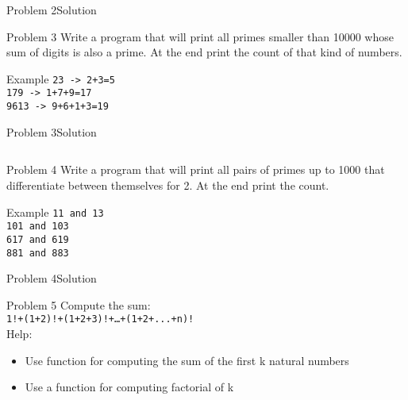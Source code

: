 \begin{frame}[fragile]{Problem 2}{Solution} 

\end{frame}

\begin{frame}{Problem 3}
Write a program that will print all primes smaller than 10000 whose sum of
digits is also a prime. At the end print the count of that kind of numbers.
\begin{exampleblock}{Example}
\texttt{23 -> 2+3=5}\\
\texttt{179 -> 1+7+9=17}\\
\texttt{9613 -> 9+6+1+3=19}
\end{exampleblock}
\end{frame}

\begin{frame}[fragile]{Problem 3}{Solution} 
\begin{columns}
    
    
\end{columns}
\end{frame}

\begin{frame}{Problem 4}
Write a program that will print all pairs of primes up to 1000 that
differentiate between themselves for 2. At the end print the count.
\begin{exampleblock}{Example}
\texttt{11 and 13}\\
\texttt{101 and 103}\\
\texttt{617 and 619}\\
\texttt{881 and 883}
\end{exampleblock}
\end{frame}

\begin{frame}[fragile]{Problem 4}{Solution}
   
\end{frame}

\begin{frame}{Problem 5}
Compute the sum:\\
\texttt{1!+(1+2)!+(1+2+3)!+\ldots+(1+2+...+n)!}
\\Help:\\
\begin{itemize}
    \item Use function for computing the sum of the first k natural numbers
    \item Use a function for computing factorial of k
\end{itemize}
\end{frame}

